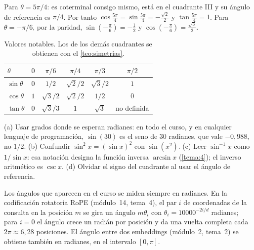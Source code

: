 \begin{ejemplo}\label{ej:reduccion}
Para $\theta=5\pi/4$: es coterminal consigo mismo, está en el cuadrante III y su ángulo de referencia es $\pi/4$. Por tanto $\cos\frac{5\pi}{4}=\sin\frac{5\pi}{4}=-\frac{\sqrt2}{2}$ y $\tan\frac{5\pi}{4}=1$. Para $\theta=-\pi/6$, por la paridad, $\sin(-\frac{\pi}{6})=-\frac12$ y $\cos(-\frac{\pi}{6})=\frac{\sqrt3}{2}$.
\end{ejemplo}

\begin{table}[ht]
\centering\small
\caption{Valores notables. Los de los demás cuadrantes se obtienen con el \cref{teo:simetrias}.}\label{tab:notables}
\begin{tabular}{@{}lccccc@{}}
\toprule
$\theta$ & $0$ & $\pi/6$ & $\pi/4$ & $\pi/3$ & $\pi/2$ \\
\midrule
$\sin\theta$ & $0$ & $1/2$ & $\sqrt2/2$ & $\sqrt3/2$ & $1$ \\
$\cos\theta$ & $1$ & $\sqrt3/2$ & $\sqrt2/2$ & $1/2$ & $0$ \\
$\tan\theta$ & $0$ & $\sqrt3/3$ & $1$ & $\sqrt3$ & no definida \\
\bottomrule
\end{tabular}
\end{table}

\begin{observacion}
(a) Usar grados donde se esperan radianes: en todo el curso, y en cualquier lenguaje de programación, $\sin(30)$ es el seno de 30 radianes, que vale $-0{,}988$, no $1/2$. (b) Confundir $\sin^{2}x=(\sin x)^{2}$ con $\sin(x^{2})$. (c) Leer $\sin^{-1}x$ como $1/\sin x$: esa notación designa la función inversa $\arcsin x$ (\cref{tema:4}); el inverso aritmético es $\csc x$. (d) Olvidar el signo del cuadrante al usar el ángulo de referencia.
\end{observacion}

\begin{observacion}
Los ángulos que aparecen en el curso se miden siempre en radianes. En la codificación rotatoria RoPE (módulo~14, tema~4), el par $i$ de coordenadas de la consulta en la posición $m$ se gira un ángulo $m\theta_i$ con $\theta_i=10000^{-2i/d}$ radianes; para $i=0$ el ángulo crece un radián por posición y da una vuelta completa cada $2\pi\approx 6{,}28$ posiciones. El ángulo entre dos embeddings (módulo~2, tema~2) se obtiene también en radianes, en el intervalo $[0,\pi]$.
\end{observacion}

